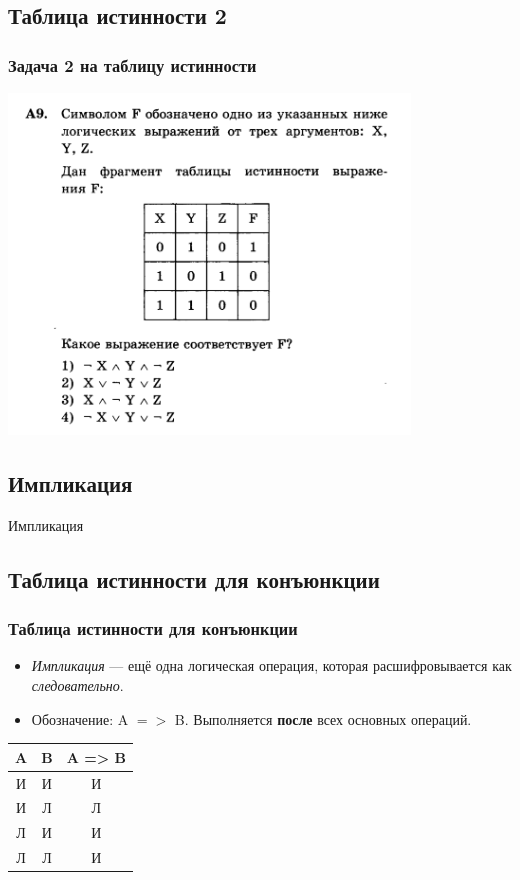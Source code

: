 \documentclass[compress,red]{beamer}
\begin{document}
\subsection{Таблица истинности 2}
\begin{frame}[fragile]
  \frametitle{Задача 2 на таблицу истинности}
  \centerline{\includegraphics[width=0.8\textwidth]{images/logic-03.png}}
\end{frame}

\subsection{Импликация}
\begin{frame}
  \begin{center}
    \Huge{Импликация}
  \end{center}
\end{frame}

\subsection{Таблица истинности для конъюнкции}
\begin{frame}[fragile]
  \frametitle{Таблица истинности для конъюнкции}
  \begin{itemize}
    \item \emph{Импликация} --- ещё одна логическая операция, которая расшифровывается как \emph{следовательно}.
    \item Обозначение: A $=>$ B. Выполняется \textbf{после} всех основных операций.
  \end{itemize}
  \begin{center}
    \begin{tabular}{|c|c|c|}
      \hline
      A & B & A => B \\
      \hline
      И & И & И \\
      \hline
      И & Л & Л \\
      \hline
      Л & И & И \\
      \hline
      Л & Л & И \\
      \hline
    \end{tabular}
  \end{center}
\end{frame}
\end{document}
